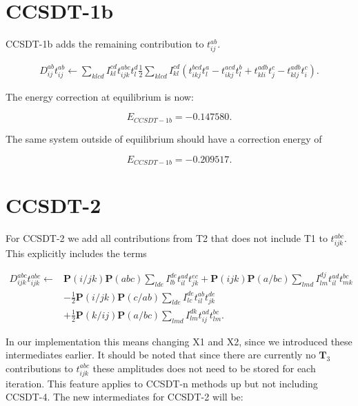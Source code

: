 \section{CCSDT-1b}
CCSDT-1b adds the remaining contribution to $t_{ij}^{ab}$. 

\begin{align}
D_{ij}^{ab} t_{ij}^{ab} \leftarrow
\sum_{klcd} I_{kl}^{cd} t_{ijk}^{abc} t_l^d  \frac{1}{2} \sum_{klcd} I_{kl}^{cd} \left(
 t_{ikj}^{bcd} t_l^a - t_{ikj}^{acd} t_l^b 
 + t_{kli}^{adb} t_j^c - t_{klj}^{adb} t_i^c \right) .
\end{align}

The energy correction at equilibrium is now:

\begin{equation} 
E_{CCSDT-1b} = -0.147580 .
\end{equation}

The same system outside of equilibrium should have a correction energy of

\begin{equation}
E_{CCSDT-1b} = -0.209517  .
\end{equation}

\section{CCSDT-2}
For CCSDT-2 we add all contributions from T2 that does not include T1 to $t_{ijk}^{abc}$. This explicitly includes the terms

\begin{align}
D_{ijk}^{abc} t_{ijk}^{abc} \leftarrow & 
\textbf{P}(i/jk) \textbf{P}(abc) \sum_{lde} I_{lb}^{de} t_{il}^{ad} t_{jk}^{ec}
+ \textbf{P}(ijk) \textbf{P}(a/bc) \sum_{lmd} I_{lm}^{dj} t_{il}^{ad} t_{mk}^{bc} \nonumber \\ &
- \frac{1}{2} \textbf{P}(i/jk) \textbf{P}(c/ab) \sum_{lde} I_{lc}^{de} t_{il}^{ab} t_{jk}^{de} \nonumber \\ & 
 + \frac{1}{2} \textbf{P}(k/ij) \textbf{P}(a/bc) \sum_{lmd} I_{lm}^{dk} t_{ij}^{ad} t_{lm}^{bc}  .
\end{align}

In our implementation this means changing X1 and X2, since we introduced these intermediates earlier. It should be noted that since there are currently no $\textbf{T}_3$ contributions to $t_{ijk}^{abc}$ these amplitudes does not need to be stored for each iteration. This feature applies to CCSDT-n methods up but not including CCSDT-4. The new intermediates for CCSDT-2 will be:


